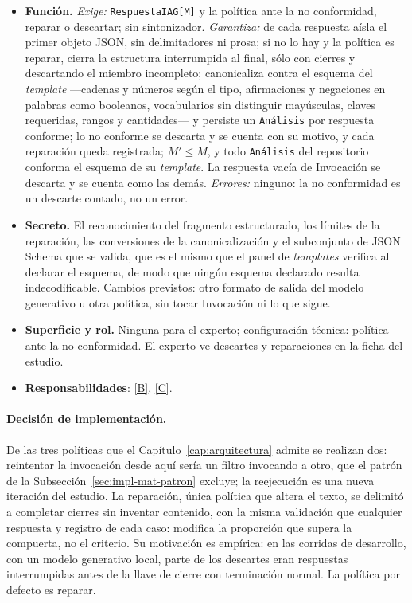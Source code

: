 \documentclass[12pt]{report}
\DeclareRobustCommand{\resp}[1]{\hyperref[tab:registro-responsabilidades]{\textcolor{respcolor}{[#1]}}}
\begin{document}
\begin{itemize}
  \item \textbf{Función.} \textit{Exige:} \texttt{RespuestaIAG[M]} y la política ante la no conformidad, reparar o descartar; sin sintonizador. \textit{Garantiza:} de cada respuesta aísla el primer objeto JSON, sin delimitadores ni prosa; si no lo hay y la política es reparar, cierra la estructura interrumpida al final, sólo con cierres y descartando el miembro incompleto; canonicaliza contra el esquema del \textit{template} ---cadenas y números según el tipo, afirmaciones y negaciones en palabras como booleanos, vocabularios sin distinguir mayúsculas, claves requeridas, rangos y cantidades--- y persiste un \texttt{Análisis} por respuesta conforme; lo no conforme se descarta y se cuenta con su motivo, y cada reparación queda registrada; \(M' \le M\), y todo \texttt{Análisis} del repositorio conforma el esquema de su \textit{template}. La respuesta vacía de Invocación se descarta y se cuenta como las demás. \textit{Errores:} ninguno: la no conformidad es un descarte contado, no un error.
  \item \textbf{Secreto.} El reconocimiento del fragmento estructurado, los límites de la reparación, las conversiones de la canonicalización y el subconjunto de JSON Schema que se valida, que es el mismo que el panel de \textit{templates} verifica al declarar el esquema, de modo que ningún esquema declarado resulta indecodificable. Cambios previstos: otro formato de salida del modelo generativo u otra política, sin tocar Invocación ni lo que sigue.
  \item \textbf{Superficie y rol.} Ninguna para el experto; configuración técnica: política ante la no conformidad. El experto ve descartes y reparaciones en la ficha del estudio.
  \item \textbf{Responsabilidades}: \resp{B}, \resp{C}.
\end{itemize}

\paragraph{Decisión de implementación.} De las tres políticas que el Capítulo~\ref{cap:arquitectura} admite se realizan dos: reintentar la invocación desde aquí sería un filtro invocando a otro, que el patrón de la Subsección~\ref{sec:impl-mat-patron} excluye; la reejecución es una nueva iteración del estudio. La reparación, única política que altera el texto, se delimitó a completar cierres sin inventar contenido, con la misma validación que cualquier respuesta y registro de cada caso: modifica la proporción que supera la compuerta, no el criterio. Su motivación es empírica: en las corridas de desarrollo, con un modelo generativo local, parte de los descartes eran respuestas interrumpidas antes de la llave de cierre con terminación normal. La política por defecto es reparar.
\end{document}
